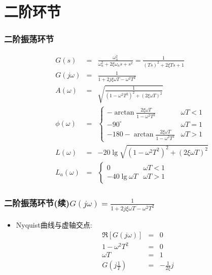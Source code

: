 \documentclass[table]{beamer}
\begin{document}
\section{二阶环节}
\label{sec-3}
\begin{frame}
\frametitle{二阶振荡环节}
\label{sec-3-1}

\begin{eqnarray*}
G(s) & = & \frac{\omega_n^2}{\omega_n^2 +2\xi\omega_n s + s^2}
       =   \frac{1}{(Ts)^2+2\xi Ts+1} \\
G(j\omega) & =& \frac{1}{1+2j\xi\omega T-\omega^2 T^2}\\
A(\omega) &=& \sqrt{\frac{1}{(1-\omega^2 T^2)^2+(2\xi\omega T)^2}}\\
\phi(\omega) &=& 
\begin{cases}
-\arctan\frac{2\xi\omega T}{1-\omega^2 T^2} & \omega T <1 \\
-90^{\circ} & \omega T =1 \\
-180-\arctan\frac{2\xi\omega T}{1-\omega^2 T^2} & \omega T >1 
\end{cases} \\
L(\omega)&=& -20\lg\sqrt{(1-\omega^2 T^2)^2+(2\xi\omega T)^2}\\
L_a(\omega)&=& 
\begin{cases} 0 & \omega T<1 \\ 
-40\lg\omega T & \omega T>1
\end{cases}
\end{eqnarray*}
\end{frame}
\begin{frame}
\frametitle{二阶振荡环节(续)$G(j\omega) = \frac{1}{1+2j\xi\omega T-\omega^2 T^2}$}
\label{sec-3-2}

\begin{itemize}
\item Nyquist曲线与虚轴交点:
     \begin{eqnarray*}
     \Re[G(j\omega)] &=& 0\\
     1-\omega^2 T^2 &=& 0\\
     \omega T &=&1\\
     G(j\frac{1}{T})&=&-\frac{1}{2\xi}j
     \end{eqnarray*}
\end{itemize}
\end{frame}
\end{document}
